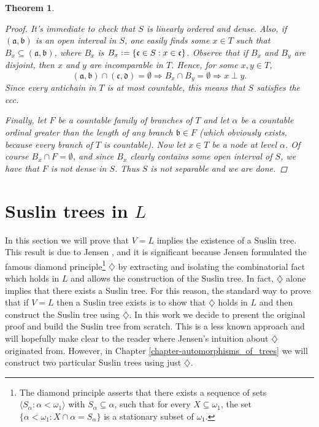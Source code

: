 \documentclass[11pt,a4paper]{report}
\newtheorem{theorem}{Theorem}[chapter] %
\theoremstyle{definition}
\theoremstyle{num.custom-title}
\theoremstyle{custom-title}
\DeclareMathOperator{\imp}{\Rightarrow}
\DeclareMathOperator{\sse}{\subseteq}
\newcommand*{\defeq}{\mathrel{\rlap{%
                     \raisebox{0.3ex}{$\cdot$}}%
                     \raisebox{-0.3ex}{$\cdot$}}%
                     =}
\begin{document}
\begin{theorem}
\begin{proof}
It's immediate to check that $S$ is linearly ordered and dense. Also, if $(\mathfrak{a},\mathfrak{b})$ is an open interval in $S$, one easily finds some $x \in T$ such that $B_x \sse (\mathfrak{a},\mathfrak{b})$, where $B_x$ is $B_x \defeq \{\mathfrak{c} \in S : x \in \mathfrak{c}\}$. Observe that if $B_x$ and $B_y$ are disjoint, then $x$ and $y$ are incomparable in $T$. Hence, for some $x,y \in T$,
\[
(\mathfrak{a},\mathfrak{b}) \cap (\mathfrak{c},\mathfrak{d}) = \emptyset \imp B_x \cap B_y = \emptyset \imp x \perp y.
\]
Since every antichain in $T$ is at most countable, this means that $S$ satisfies the ccc.

Finally, let $F$ be a countable family of branches of $T$ and let $\alpha$ be a countable ordinal greater than the length of any branch $\mathfrak{b} \in F$ (which obviously exists, because every branch of $T$ is countable). Now let $x \in T$ be a node at level $\alpha$. Of course $B_x \cap F = \emptyset$, and since $B_x$ clearly contains some open interval of $S$, we have that $F$ is not dense in $S$. Thus $S$ is not separable and we are done.
\end{proof}
\end{theorem}


\section{Suslin trees in $L$}

In this section we will prove that $V=L$ implies the existence of a Suslin tree. This result is due to Jensen \cite{Jen1968}, and it is significant because Jensen formulated the famous diamond principle\footnote{The diamond principle asserts that there exists a sequence of sets $\langle S_\alpha : \alpha < \omega_1 \rangle$ with $S_\alpha \sse \alpha$, such that for every $X \sse \omega_1$, the set $\{\alpha < \omega_1 : X \cap \alpha = S_\alpha \}$ is a stationary subset of $\omega_1$.} $\diamondsuit$ by extracting and isolating the combinatorial fact which holds in $L$ and allows the construction of the Suslin tree. In fact, $\diamondsuit$ alone implies that there exists a Suslin tree. For this reason, the standard way to prove that if $V=L$ then a Suslin tree exists is to show that $\diamondsuit$ holds in $L$ and then construct the Suslin tree using $\diamondsuit$. In this work we decide to present the original proof and build the Suslin tree from scratch. This is a less known approach and will hopefully make clear to the reader where Jensen's intuition about $\diamondsuit$ originated from. However, in Chapter \ref{chapter-automorphisms_of_trees} we will construct two particular Suslin trees using just $\diamondsuit$.
\end{document}
